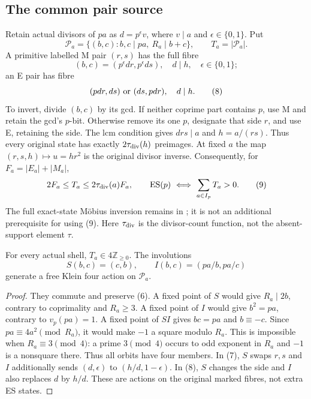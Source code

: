 \subsection{The common pair source}
Retain actual divisors of $pa$ as $d=p^\epsilon v$, where $v\mid a$ and
$\epsilon\in\{0,1\}$. Put
\[
 \mathcal P_a=\{(b,c):b,c\mid pa,\ R_a\mid b+c\},\qquad T_a=|\mathcal P_a|.
                                                               \tag{6}
\]
A primitive labelled M pair $(r,s)$ has the full fibre
\[
 (b,c)=(p^\epsilon d r,p^\epsilon d s),\quad d\mid h,
 \quad \epsilon\in\{0,1\};                                \tag{7}
\]
an E pair has fibre
\[
 (pdr,ds)\ \hbox{or}\ (ds,pdr),\quad d\mid h.              \tag{8}
\]
To invert, divide $(b,c)$ by its gcd. If neither coprime part contains $p$, use
M and retain the gcd's $p$-bit. Otherwise remove its one $p$, designate that side
$r$, and use E, retaining the side. The lcm condition gives $drs\mid a$ and
$h=a/(rs)$. Thus every original state has exactly $2\tau_{\rm div}(h)$ preimages.
At fixed $a$ the map $(r,s,h)\mapsto u=hr^2$ is the original divisor inverse.
Consequently, for $F_a=|E_a|+|M_a|$,
\[
 2F_a\le T_a\le2\tau_{\rm div}(a)F_a,\qquad
 \operatorname{ES}(p)\ \Longleftrightarrow\ \sum_{a\in I_p}T_a>0. \tag{9}
\]
The full exact-state M\"obius inversion remains in \cite[\S4, ``Complete primitive count'']{Turn5}; it
is not an additional prerequisite for using (9). Here $\tau_{\rm div}$ is the
divisor-count function, not the absent-support element $\tau$.

\begin{lemma}\label{lem:four}
For every actual shell, $T_a\in4\mathbb Z_{\ge0}$. The involutions
\[
 S(b,c)=(c,b),\qquad I(b,c)=(pa/b,pa/c)                    \tag{10}
\]
generate a free Klein four action on $\mathcal P_a$.
\end{lemma}
\begin{proof}
They commute and preserve (6). A fixed point of $S$ would give $R_a\mid2b$,
contrary to coprimality and $R_a\ge3$. A fixed point of $I$ would give $b^2=pa$,
contrary to $v_p(pa)=1$. A fixed point of $SI$ gives $bc=pa$ and $b\equiv-c$.
Since $pa\equiv4a^2\pmod{R_a}$, it would make $-1$ a square modulo $R_a$.
This is impossible when $R_a\equiv3\pmod4$: a prime $3\pmod4$ occurs to odd
exponent in $R_a$ and $-1$ is a nonsquare there. Thus all orbits have four members.
In (7), $S$ swaps $r,s$ and $I$ additionally sends $(d,\epsilon)$ to
$(h/d,1-\epsilon)$. In (8), $S$ changes the side and $I$ also replaces $d$ by
$h/d$. These are actions on the original marked fibres, not extra ES states.
\end{proof}

